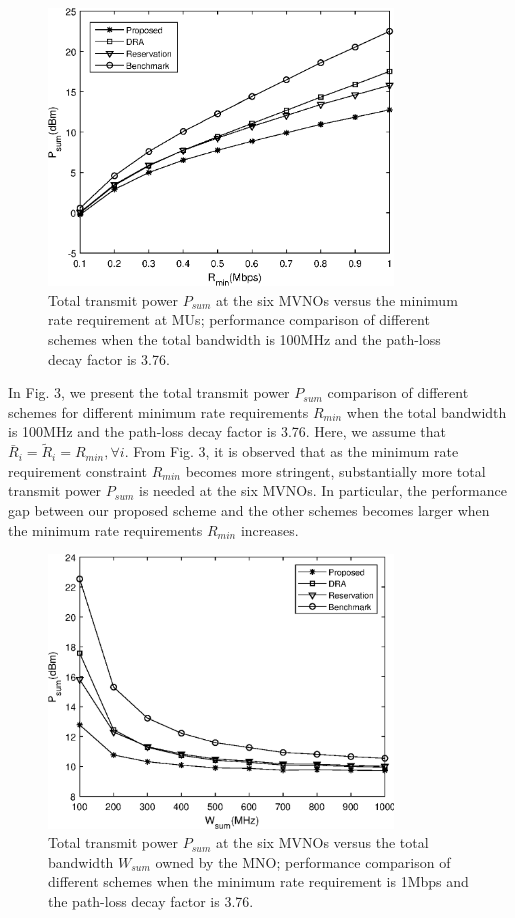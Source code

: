\documentclass[journal]{IEEEtran}
\begin{document}
\begin{figure}
	\centering
	\includegraphics[width=3.6in]{P_rmin.eps}
	\caption{Total transmit power $P_{sum}$ at the six MVNOs versus the minimum rate requirement at MUs; performance comparison of different schemes when the total bandwidth is 100MHz and the path-loss decay factor is 3.76.}
\end{figure}

In Fig. 3, we present the total transmit power $P_{sum}$ comparison of different schemes for different minimum rate requirements $R_{min}$ when the total bandwidth is 100MHz and the path-loss decay factor is 3.76. Here, we assume that $\bar{R}_i = \tilde{R}_i= R_{min}, \forall i$. From Fig. 3, it is observed that as the minimum rate requirement constraint $R_{min}$ becomes more stringent, substantially more total transmit power $P_{sum}$ is needed at the six MVNOs. In particular, the performance gap between our proposed scheme and the other schemes becomes larger when the minimum rate requirements $R_{min}$ increases.

\begin{figure}
	\centering
	\includegraphics[width=3.6in]{P_wsum.eps}
	\caption{Total transmit power $P_{sum}$ at the six MVNOs versus the total bandwidth $W_{sum}$ owned by the MNO; performance comparison of different schemes when the minimum rate requirement is 1Mbps and the path-loss decay factor is 3.76.}
\end{figure}
\end{document}
